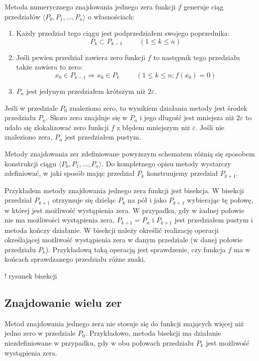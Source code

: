 \documentclass{article}
\begin{document}
Metoda numerycznego znajdowania jednego zera funkcji $f$ generuje ciąg przedziałów $\langle P_0, P_1, ..., P_n\rangle$ o własnościach:
\begin{enumerate}
\item Każdy przedział tego ciągu jest podprzedziałem swojego poprzednika:
$$P_k \subset P_{k-1}\hspace{1cm}(1 \leq k \leq n)$$
\item Jeśli pewien przedział zawiera zero funkcji $f$ to następnik tego przedziału także zawiera to zero:
$$ x_0 \in P_{k-1}\Rightarrow x_0 \in P_k\hspace{1cm}(1 \leq k \leq n;f(x_0)=0)$$
\item $P_n$ jest jedynym przedziałem krótszym niż $2 \varepsilon$.
\end{enumerate}

Jeśli w przedziale $P_0$ znaleziono zero, to wynikiem działania metody jest środek przedziału $P_n$. Skoro zero znajduje się w $P_n$ i jego długość jest mniejsza niż $2 \varepsilon$ to udało się zlokalizować zero funkcji $f$ z błędem mniejszym niż $\varepsilon$. Jeśli nie znaleziono zera, $P_n$ jest przedziałem pustym.

Metody znajdowania zer zdefiniowane powyższym schematem różnią się sposobem konstrukcji ciągu $\langle P_0, P_1, ..., P_n\rangle$. Do kompletnego opisu metody wystarczy zdefiniować, w jaki sposób mając przedział $P_k$ konstruujemy przedział $P_{k+1}$.

Przykładem metody znajdowania jednego zera funkcji jest bisekcja. W bisekcji przedział $P_{k+1}$ otrzymuje się dzieląc $P_k$ na pół i jako $P_{k+1}$ wybierając tę połowę, w której jest możliwość wystąpienia zera. W przypadku, gdy w żadnej połowie nie ma możliwości wystąpienia zera, $P_{k+1} = P_n$ i $P_{k+1}$ jest przedziałem pustym i metoda kończy działanie. W bisekcji należy określić realizację operacji określającej możliwość wystąpienia zera w danym przedziale (w danej połowie przedziału $P_k$). Przykładową taką operacją jest sprawdzenie, czy funkcja $f$ ma w końcach sprawdzanego przedziału różne znaki.

! rysunek bisekcji

\subsection{Znajdowanie wielu zer}

Metod znajdowania jednego zera nie stosuje się do funkcji mających więcej niż jedno zero w przedziale $P_0$. Przykładowo, metoda bisekcji ma działanie niezdefiniowane w przypadku, gdy w obu połowach przedziału $P_k$ jest możliwość wystąpienia zera.
\end{document}
